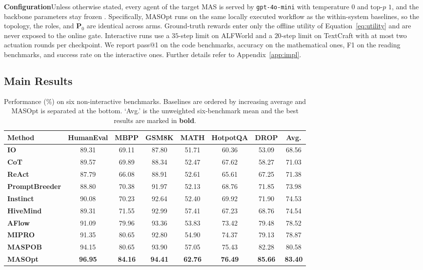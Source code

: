 \documentclass{article}
\theoremstyle{definition}
\begin{document}
\textbf{Configuration}\quad Unless otherwise stated, every agent of the target MAS is served by \texttt{gpt-4o-mini} with temperature $0$ and top-$p$ $1$, and the backbone parameters stay frozen \citep{yang2026skillopt}. Specifically, MASOpt runs on the same locally executed workflow as the within-system baselines, so the topology, the roles, and $\mathbf{P}_0$ are identical across arms. Ground-truth rewards enter only the offline utility of Equation~\ref{eq:utility} and are never exposed to the online gate. Interactive runs use a $35$-step limit on ALFWorld and a $20$-step limit on TextCraft with at most two actuation rounds per checkpoint. We report pass@1 on the code benchmarks, accuracy on the mathematical ones, F1 on the reading benchmarks, and success rate on the interactive ones. Further details refer to Appendix~\ref{app:impl}.

\subsection{Main Results}
\label{sec:main-results}

\begin{table}[t]
    \centering
    \caption{Performance (\%) on six non-interactive benchmarks. Baselines are ordered by increasing average and MASOpt is separated at the bottom. `Avg.' is the unweighted six-benchmark mean and the best results are marked in \textbf{bold}.}
    \label{tab:main-results}
    \small
    \setlength{\tabcolsep}{5pt}
    \begin{tabular}{@{}lccccccc@{}}
        \toprule
        \textbf{Method} & \textbf{HumanEval} & \textbf{MBPP} & \textbf{GSM8K} & \textbf{MATH} & \textbf{HotpotQA} & \textbf{DROP} & \textbf{Avg.} \\
        \midrule
        \textbf{IO} & 89.31 & 69.11 & 87.80 & 51.71 & 60.36 & 53.09 & 68.56 \\
        \textbf{CoT} & 89.57 & 69.89 & 88.34 & 52.47 & 67.62 & 58.27 & 71.03 \\
        \textbf{ReAct} & 87.79 & 66.08 & 88.91 & 52.61 & 65.61 & 67.25 & 71.38 \\
        \textbf{PromptBreeder} & 88.80 & 70.38 & 91.97 & 52.13 & 68.76 & 71.85 & 73.98 \\
        \textbf{Instinct} & 90.08 & 70.23 & 92.64 & 52.40 & 69.92 & 71.90 & 74.53 \\
        \textbf{HiveMind} & 89.31 & 71.55 & 92.99 & 57.41 & 67.23 & 68.76 & 74.54 \\
        \textbf{AFlow} & 91.09 & 79.96 & 93.36 & 53.83 & 73.42 & 79.48 & 78.52 \\
        \textbf{MIPRO} & 91.35 & 80.65 & 92.80 & 54.90 & 74.37 & 79.13 & 78.87 \\
        \textbf{MASPOB} & 94.15 & 80.65 & 93.90 & 57.05 & 75.43 & 82.28 & 80.58 \\
        \midrule
        \rowcolor{gray!15}\textbf{MASOpt} & \textbf{96.95} & \textbf{84.16} & \textbf{94.41} & \textbf{62.76} & \textbf{76.49} & \textbf{85.66} & \textbf{83.40} \\
        \bottomrule
    \end{tabular}
\end{table}
\end{document}
